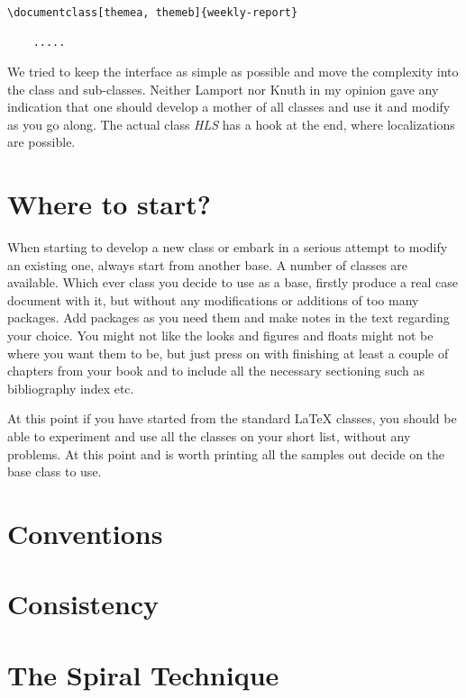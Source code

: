 \begin{verbatim}
\documentclass[themea, themeb]{weekly-report}

    .....

\end{verbatim}

We tried to keep the interface as simple as possible and move the complexity into the class and sub-classes. Neither Lamport nor Knuth in my opinion gave any indication that one should develop a mother of all classes and use it and modify as you go along. The actual class \textit{HLS} has a hook at the end, where localizations are possible.



\section*{Where to start?}

When starting to develop a new class or embark in a serious attempt to modify an existing one, always start from another base. A number of classes are available. Which ever class you decide to use as a base, firstly produce a real case document with it, but without any modifications or additions of too many packages. Add packages as you need them and make notes in the text regarding your choice. You might not like the looks and figures and floats might not be where you want them to be, but just press on with finishing at least a couple of chapters from your book and to include all the necessary sectioning such as bibliography index etc.

At this point if you have started from the standard LaTeX classes, you should be able to experiment and use all the classes on your short list, without any problems. At this point and is worth printing all the samples out decide on the base class to use.


\section*{Conventions}

\section*{Consistency}


\section*{The Spiral Technique}

